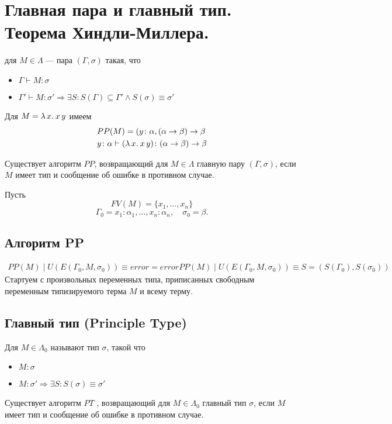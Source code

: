 \documentclass[11pt,a4paper]{article}
\begin{document}
\section{Главная пара и главный тип. Теорема Хиндли-Миллера.}
\begin{defn}
	 для $ M \in \Lambda$ --- пара $ ( \Gamma , \sigma )$ такая, что
	\begin{itemize}
		\item $ \Gamma \vdash M \colon \sigma $
		\item $ \Gamma ' \vdash M \colon \sigma ' \Longrightarrow \exists S \colon S(\Gamma) \subseteq \Gamma ' \wedge S(\sigma) \equiv \sigma '$
\end{itemize}
\end{defn}
\begin{ex}
	Для $M = \lambda\,{x}.\:{x\, y}$ имеем
	\[
	\begin{aligned}
		&PP(M) = (y\colon \alpha , ( \alpha \to  \beta ) \to  \beta 
		\\
		& y\colon \alpha \vdash (\lambda\,{x}.\:{x\,y})\colon ( \alpha \to \beta ) \to \beta 
	\end{aligned}
	\]
\end{ex}
\begin{thm}
Существует алгоритм $PP$, возвращающий для $M \in  \Lambda$ главную пару $(\Gamma , \sigma )$, если $ M$ имеет тип и сообщение об ошибке в противном случае.
\end{thm}
Пусть 
\[
	FV(M) = \{x_1 , \ldots  , x_n \}
\]
\[
	\Gamma_ 0 = {x_1 \colon  \alpha _1 , \ldots  , x_n \colon  \alpha _n }, \quad\sigma_0 = \beta 
.\] 
\subsection{Алгоритм PP}
\[
\begin{aligned}
PP(M) \mid U(E(\Gamma_0 , M, \sigma _0 )) \equiv  error = error
PP(M) \mid U(E(\Gamma_0 , M, \sigma _ 0 )) \equiv  S = (S(\Gamma_0 ), S(\sigma_0 ))
\end{aligned}
\]
Стартуем с произвольных переменных типа, приписанных свободным переменным типизируемого терма $M$ и всему терму.

\subsection{Главный тип (Principle Type)}
\begin{defn}
	Для $M \in  \Lambda_0$  называют тип $ \sigma $, такой что
	\begin{itemize}
		\item
			$ M \colon \sigma $
		\item $ M \colon \sigma ' \Longrightarrow \exists S\colon S(\sigma) \equiv \sigma '$
\end{itemize}
\end{defn}
\begin{cor}
Существует алгоритм $PT$ , возвращающий для $M \in  \Lambda_0$ главный тип $ \sigma $, если $ M$ имеет тип и сообщение об ошибке в противном случае.
\end{cor}
\end{document}
